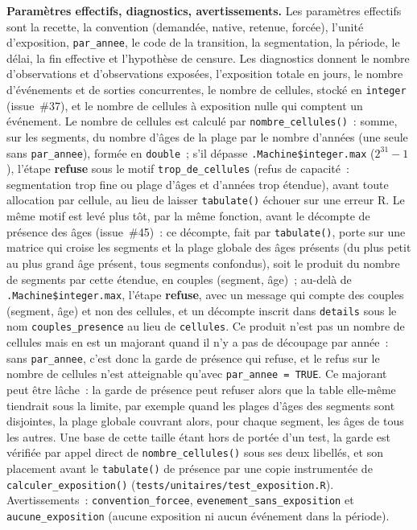 \documentclass[a4paper,11pt]{article}
\newcommand{\code}[1]{\texttt{\small #1}}
\begin{document}
\medskip
\textbf{Paramètres effectifs, diagnostics, avertissements.} Les paramètres
effectifs sont la recette, la convention (demandée, native, retenue,
forcée), l'unité d'exposition, \code{par\_annee}, le code de la transition, la
segmentation, la période, le délai, la fin effective et l'hypothèse de
censure. Les diagnostics donnent le nombre d'observations et d'observations
exposées, l'exposition totale en jours, le nombre d'événements et de sorties
concurrentes, le nombre de cellules, stocké en \code{integer}
(issue~\#37), et le nombre de cellules à exposition nulle qui
comptent un événement. Le nombre de cellules est calculé par
\code{nombre\_cellules()}~: somme, sur les segments, du nombre d'âges de la
plage par le nombre d'années (une seule sans \code{par\_annee}), formée en
\code{double}~; s'il dépasse \code{.Machine\$integer.max}
($2^{31} - 1$), l'étape \textbf{refuse} sous le motif
\code{trop\_de\_cellules} (refus de capacité~: segmentation trop fine ou
plage d'âges et d'années trop étendue), avant toute allocation par cellule,
au lieu de laisser \code{tabulate()} échouer sur une erreur R. Le même motif
est levé plus tôt, par la même fonction, avant le décompte de présence des
âges (issue~\#45)~: ce décompte, fait par \code{tabulate()}, porte sur une
matrice qui croise les segments et la plage globale des âges présents (du
plus petit au plus grand âge présent, tous segments confondus), soit le
produit du nombre de segments par cette étendue, en couples (segment, âge)~;
au-delà de \code{.Machine\$integer.max}, l'étape \textbf{refuse}, avec un
message qui compte des couples (segment, âge) et non des cellules, et un
décompte inscrit dans \code{details} sous le nom \code{couples\_presence} au
lieu de \code{cellules}. Ce produit n'est pas un nombre de cellules mais en
est un majorant quand il n'y a pas de découpage par année~: sans
\code{par\_annee}, c'est donc la garde de présence qui refuse, et le refus sur
le nombre de cellules n'est atteignable qu'avec \code{par\_annee = TRUE}.
Ce majorant peut être lâche~: la garde de présence peut refuser alors que la
table elle-même tiendrait sous la limite, par exemple quand les plages d'âges
des segments sont disjointes, la plage globale couvrant alors, pour chaque
segment, les âges de tous les autres. Une
base de cette taille étant hors de portée d'un test, la garde est vérifiée
par appel direct de \code{nombre\_cellules()} sous ses deux libellés, et son
placement avant le \code{tabulate()} de présence par une copie instrumentée
de \code{calculer\_exposition()} (\code{tests/unitaires/test\_exposition.R}).
Avertissements~: \code{convention\_forcee},
\code{evenement\_sans\_exposition} et \code{aucune\_exposition} (aucune
exposition ni aucun événement dans la période).
\end{document}
